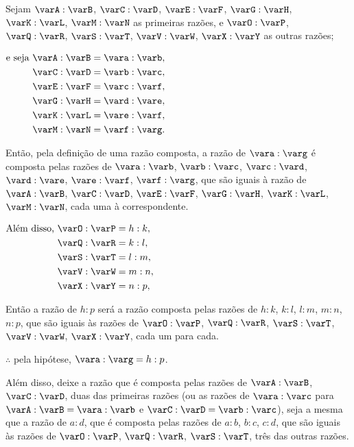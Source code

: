 \documentclass[booklanguage=brazilian]{byrnebook}
\begin{document}
Sejam $\varA : \varB$, $\varC : \varD$, $\varE : \varF$, $\varG : \varH$, $\varK : \varL$, $\varM : \varN$ as primeiras razões, e $\varO : \varP$, $\varQ : \varR$, $\varS : \varT$, $\varV : \varW$, $\varX : \varY$ as outras razões;

\begin{center}
$\begin{aligned}
\mbox{e seja }
\varA : \varB &= \vara : \varb ,\\
\varC : \varD &= \varb : \varc ,\\
\varE : \varF &= \varc : \varf ,\\
\varG : \varH &= \vard : \vare ,\\
\varK : \varL &= \vare : \varf ,\\
\varM : \varN &= \varf : \varg .
\end{aligned}$
\end{center}

Então, pela definição de uma razão composta, a razão de $\vara : \varg$ é composta pelas razões de $\vara : \varb$, $\varb : \varc$, $\varc : \vard$, $\vard : \vare$, $\vare : \varf$, $\varf : \varg$, que são iguais à razão de $\varA : \varB$, $\varC : \varD$, $\varE : \varF$, $\varG : \varH$, $\varK : \varL$, $\varM : \varN$, cada uma à correspondente.

\begin{center}
$\begin{aligned}
\mbox{Além disso, }
\varO : \varP &= h : k ,\\
\varQ : \varR &= k : l ,\\
\varS : \varT &= l : m ,\\
\varV : \varW &= m : n ,\\
\varX : \varY &= n : p ,\\
\end{aligned}$
\end{center}

Então a razão de $h : p$ será a razão composta pelas razões de $h : k$, $k : l$, $l : m$, $m : n$, $n : p$, que são iguais às razões de $\varO : \varP$, $\varQ : \varR$, $\varS : \varT$, $\varV : \varW$, $\varX : \varY$, cada um para cada.

\begin{center}
$\therefore$ pela hipótese, $\vara : \varg = h : p$.
\end{center}

Além disso, deixe a razão que é composta pelas razões de $\varA : \varB$, $\varC : \varD$, duas das primeiras razões (ou as razões de $\vara : \varc$ para $\varA : \varB = \vara : \varb$ e $\varC : \varD = \varb : \varc$), seja a mesma que a razão de $a : d$, que é composta pelas razões de $a : b$, $b : c$, $c : d$, que são iguais às razões de $\varO : \varP$, $\varQ : \varR$, $\varS : \varT$, três das outras razões.
\end{document}
